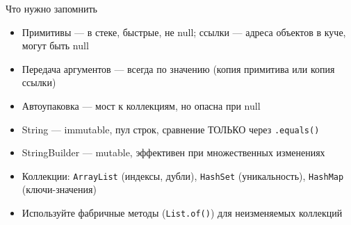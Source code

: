 \documentclass[aspectratio=169]{beamer}
\begin{document}
\begin{frame}{Что нужно запомнить}
  \begin{itemize}
    \item Примитивы — в стеке, быстрые, не null; ссылки — адреса объектов в куче, могут быть null
    \item Передача аргументов — всегда по значению (копия примитива или копия ссылки)
    \item Автоупаковка — мост к коллекциям, но опасна при null
    \item String — immutable, пул строк, сравнение ТОЛЬКО через \texttt{.equals()}
    \item StringBuilder — mutable, эффективен при множественных изменениях
    \item Коллекции: \texttt{ArrayList} (индексы, дубли), \texttt{HashSet} (уникальность), \texttt{HashMap} (ключи-значения)
    \item Используйте фабричные методы (\texttt{List.of()}) для неизменяемых коллекций
  \end{itemize}
\end{frame}
\end{document}
